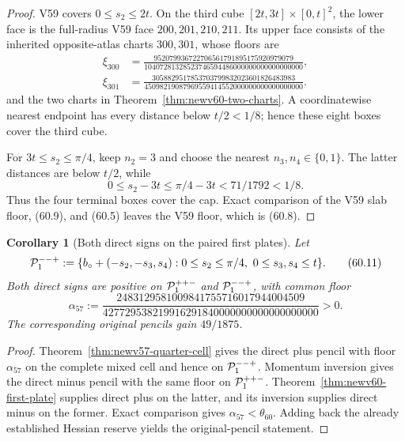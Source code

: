\documentclass[11pt,oneside]{article}
\newtheorem{corollary}[theorem]{Corollary}
\theoremstyle{definition}
\theoremstyle{remark}
\begin{document}
\begin{proof}
V59 covers \(0\le s_2\le2t\).  On the third cube
\([2t,3t]\times[0,t]^2\), the lower face is the full-radius V59
face \(200,201,210,211\).  Its upper face consists of the inherited
opposite-atlas charts \(300,301\), whose floors are
\[
\begin{aligned}
\xi_{300}&=
\frac{952079936722706561791895175920979079}
 {10407281328523746594486000000000000000000},\\
\xi_{301}&=
\frac{3058829517853703799832023601826483983}
 {45098219087969559414552000000000000000000}.
\end{aligned}                                         \tag{60.9}
\]
and the two charts in Theorem~\ref{thm:newv60-two-charts}.
A coordinatewise nearest endpoint has every distance below
\(t/2<1/8\); hence these eight boxes cover the third cube.

For \(3t\le s_2\le\pi/4\), keep \(n_2=3\) and choose the nearest
\(n_3,n_4\in\{0,1\}\).  The latter distances are below \(t/2\),
while
\[
 0\le s_2-3t\le\pi/4-3t<71/1792<1/8.                \tag{60.10}
\]
Thus the four terminal boxes cover the cap.  Exact comparison of
the V59 slab floor, (60.9), and (60.5) leaves the V59 floor,
which is (60.8).
\end{proof}

\begin{corollary}[Both direct signs on the paired first plates]
\label{cor:newv60-paired-plates}
Let
\[
 {\cal P}^{--+}_1:=
 \{b_\circ+(-s_2,-s_3,s_4):
       0\le s_2\le\pi/4,\ 0\le s_3,s_4\le t\}.        \tag{60.11}
\]
Both direct signs are positive on
\({\cal P}^{++-}_1\) and \({\cal P}^{--+}_1\), with common floor
\[
 \alpha_{57}:=
 \frac{2483129581009841755716017944004509}
 {427729538219916291840000000000000000000}>0.         \tag{60.12}
\]
The corresponding original pencils gain \(49/1875\).
\end{corollary}

\begin{proof}
Theorem~\ref{thm:newv57-quarter-cell} gives the direct plus pencil
with floor \(\alpha_{57}\) on the complete mixed cell and hence on
\({\cal P}^{--+}_1\).  Momentum inversion gives the direct minus
pencil with the same floor on \({\cal P}^{++-}_1\).
Theorem~\ref{thm:newv60-first-plate} supplies direct plus on the
latter, and its inversion supplies direct minus on the former.
Exact comparison gives \(\alpha_{57}<\theta_{60}\).  Adding back
the already established Hessian reserve yields the original-pencil
statement.
\end{proof}
\end{document}
